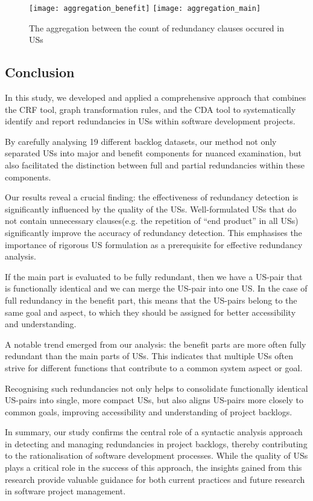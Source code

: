 \begin{figure}[h]
	\center
	\texttt{[image: aggregation\_benefit]}
	\texttt{[image: aggregation\_main]}
	\caption{The aggregation between the count of redundancy clauses occured in USs}\label{fig:aggregation}
\end{figure} 
\subsection{Conclusion}\label{redundancy_conclustion}
In this study, we developed and applied a comprehensive approach that combines the CRF tool, graph transformation rules, and the CDA tool to systematically identify and report redundancies in USs within software development projects.

By carefully analysing 19 different backlog datasets, our method not only separated USs into major and benefit components for nuanced examination, but also facilitated the distinction between full and partial redundancies within these components.

Our results reveal a crucial finding: the effectiveness of redundancy detection is significantly influenced by the quality of the USs. Well-formulated USs that do not contain unnecessary clauses(e.g. the repetition of \enquote{end product} in all USs) significantly improve the accuracy of redundancy detection. This emphasises the importance of rigorous US formulation as a prerequisite for effective redundancy analysis.

 If the main part is evaluated to be fully redundant, then we have a US-pair that is functionally identical and we can merge the US-pair into one US. In the case of full redundancy in the benefit part, this means that the US-pairs belong to the same goal and aspect, to which they should be assigned for better accessibility and understanding.
 
A notable trend emerged from our analysis: the benefit parts are more often fully redundant than the main parts of USs. This indicates that multiple USs often strive for different functions that contribute to a common system aspect or goal.

Recognising such redundancies not only helps to consolidate functionally identical US-pairs into single, more compact USs, but also aligns US-pairs more closely to common goals, improving accessibility and understanding of project backlogs.

In summary, our study confirms the central role of a syntactic analysis approach in detecting and managing redundancies in project backlogs, thereby contributing to the rationalisation of software development processes. While the quality of USs plays a critical role in the success of this approach, the insights gained from this research provide valuable guidance for both current practices and future research in software project management.

